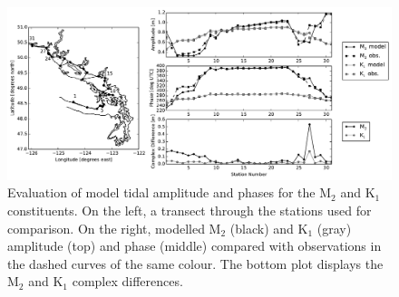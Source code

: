 \documentclass[pdftex,10pt]{article}
\begin{document}

\begin{figure}
\centering
\includegraphics[scale=0.6]{Figures/tides.pdf}
\caption{Evaluation of model tidal amplitude and phases for the M$_2$ and K$_1$ constituents. On the left, a transect through the stations used for comparison. On the right, modelled M$_2$ (black) and K$_1$ (gray) amplitude (top) and phase (middle) compared with observations in the dashed curves of the same colour. The bottom plot displays the M$_2$ and K$_1$ complex differences.}
\label{fig:tides}
\end{figure}
\end{document}
